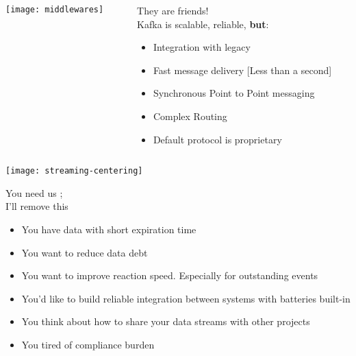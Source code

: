 \documentclass[aspectratio=169, 15pt,usenames,dvipsnames]{beamer}
\begin{document}
\begin{gdsw}
	\begin{columns}
		\begin{column}{0.4\textwidth}
			\texttt{[image: middlewares]} 
		\end{column}
		\begin{column}{0.6\textwidth}
			\large
			They are friends!\\
			Kafka is scalable, reliable, {\bf but}:
			\begin{itemize}
				\item Integration with legacy
				\pause
				\item Fast message delivery [Less than a second]
				\pause
				\item Synchronous Point to Point messaging
				\item Complex Routing
				\item Default protocol is proprietary
			\end{itemize}	
		\end{column}
	\end{columns}	
\end{gdsw}
\begin{gdsw}
	\centering\texttt{[image: streaming-centering]}         
	\begin{center}
		You need us ;
		\\ I'll remove this 
		\begin{itemize}
			\item You have data with short expiration time
			\item You want to reduce data debt
			\item You want to improve reaction speed. Especially for outstanding events
			\item You'd like to build reliable integration between systems with batteries built-in
			\item You think about how to share your data streams with other projects
			\item You tired of compliance burden
		\end{itemize}
	\end{center}
\end{gdsw}
\end{document}
